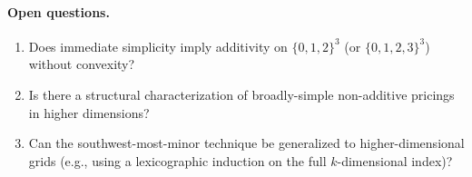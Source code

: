 \documentclass[11pt]{article}
\begin{document}
\paragraph{Open questions.}
\begin{enumerate}[label=(\roman*)]
  \item Does immediate simplicity imply additivity on $\{0,1,2\}^3$
    (or $\{0,1,2,3\}^3$) without convexity?

  \item Is there a structural characterization of broadly-simple
    non-additive pricings in higher dimensions?

  \item Can the southwest-most-minor technique be generalized to
    higher-dimensional grids (e.g., using a lexicographic induction on
    the full $k$-dimensional index)?
\end{enumerate}
\end{document}
